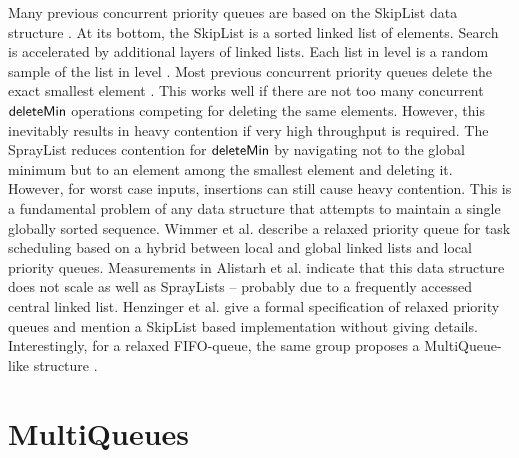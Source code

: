 \documentclass[a4paper,12pt]{article}
\newcommand{\Id}[1]{\ensuremath{\text{{\sf #1}}}}
\begin{document}
Many previous concurrent priority queues are based on the SkipList data structure \cite{Pug90}. At its bottom, the SkipList is a sorted linked list of elements. Search is accelerated by additional layers of linked lists.
Each list in level  is a random sample of the list in level .
Most previous concurrent priority queues delete the exact smallest element \cite{ShaLot00,SunTsi03,LinJon13,CMH14}. This works well if there are not too many concurrent \Id{deleteMin} operations competing for deleting the same elements. However, this inevitably results in heavy contention if very high throughput is required.
The SprayList \cite{AKLS14} reduces contention for \Id{deleteMin} by navigating not to the global minimum but to an element among the  smallest element and deleting it. However, for worst case inputs, insertions can still cause heavy contention. This is a fundamental problem of any data structure that attempts to maintain a single globally sorted sequence. 
Wimmer et al. \cite{WVTCT14} describe a relaxed priority queue for task scheduling based on a hybrid between local and global linked lists and local priority queues. Measurements in Alistarh et al. \cite{AKLS14} indicate that this data structure does not scale as well as SprayLists -- probably due to a frequently accessed central linked list.
Henzinger et al. \cite{HKPSS13} give a formal specification of relaxed priority queues and mention a SkipList based implementation without giving details.
Interestingly, for a relaxed FIFO-queue, the same group proposes a MultiQueue-like structure \cite{HLHPSKS13}.



\section{MultiQueues}
\label{s:multi}
\end{document}
